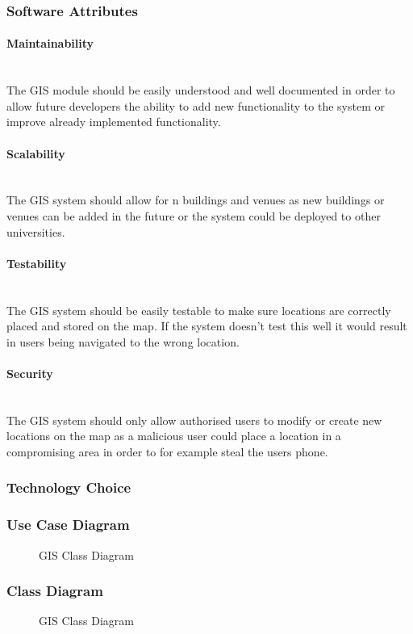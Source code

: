 \subsubsection{Software Attributes}
	
\paragraph{Maintainability}
\mbox{}\\
The GIS module should be easily understood and well documented in order to allow future developers the ability to add new functionality to the system or improve already implemented functionality.

\paragraph{Scalability}
\mbox{}\\
The GIS system should allow for n buildings and venues as new buildings or venues can be added in the future or the system could be deployed to other universities.

\paragraph{Testability}
\mbox{}\\
The GIS system should be easily testable to make sure locations are correctly placed and stored on the map. If the system doesn't test this well it would result in users being navigated to the wrong location.

\paragraph{Security}
\mbox{}\\
The GIS system should only allow authorised users to modify or create new locations on the map as a malicious user could place a location in a compromising area in order to for example steal the users phone.

\subsubsection{Technology Choice}

\pagebreak
\subsubsection{Use Case Diagram}

	\begin{figure}[h!]
	\caption{GIS Class Diagram}
	\end{figure}
\pagebreak

\subsubsection{Class Diagram}
	\begin{figure}[h!]
	\caption{GIS Class Diagram}
	\end{figure}